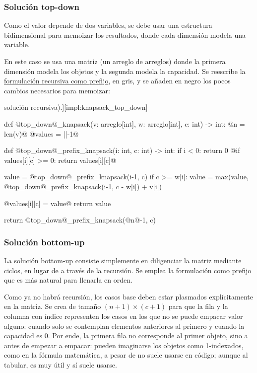 \subsubsection{Solución top-down}

Como el valor depende de dos variables, se debe usar una estructura bidimensional para memoizar los resultados, donde cada dimensión modela una variable. 

En este caso se usa una matriz (un arreglo de arreglos) donde la primera dimensión modela los objetos y la segunda modela la capacidad. Se reescribe la \hyperref[impl:knapsack_recursivo]{formulación recursiva como prefijo}, en gris, y se añaden en negro los pocos cambios necesarios para memoizar:
\begin{codeblock}[Mochila top-down (en gris: \hyperref[impl:knapsack_recursivo]{solución recursiva}).][impl:knapsack_top_down]
\begin{pseudocode}[style=derived]
def @top_down@_knapsack(v: arreglo[int], w: arreglo[int], c: int) -> int:
    @n = len(v)@
    @values = ||-1@

    def @top_down@_prefix_knapsack(i: int, c: int) -> int:
        if i < 0: return 0
        @if values[i][c] >= 0: return values[i][c]@

        value = @top_down@_prefix_knapsack(i-1, c)
        if c >= w[i]:
            value = max(value, @top_down@_prefix_knapsack(i-1, c - w[i]) + v[i])

        @values[i][c] = value@
        return value

    return @top_down@_prefix_knapsack(@n@-1, c)
\end{pseudocode}
\end{codeblock}

\subsubsection{Solución bottom-up}

La solución bottom-up consiste simplemente en diligenciar la matriz mediante ciclos, en lugar de a través de la recursión. Se emplea la formulación como prefijo que es más natural para llenarla en orden.

Como ya no habrá recursión, los casos base deben estar plasmados explícitamente en la matriz. Se crea de tamaño $(n+1) \times (c+1)$ para que la fila y la columna con índice  representen los casos en los que no se puede empacar valor alguno: cuando solo se contemplan elementos anteriores al primero y cuando la capacidad es 0. Por ende, la primera fila no corresponde al primer objeto, sino a antes de empezar a empacar: pueden imaginarse los objetos como 1-indexados, como en la fórmula matemática, a pesar de no suele usarse en código; aunque al tabular, es muy útil y sí suele usarse.

